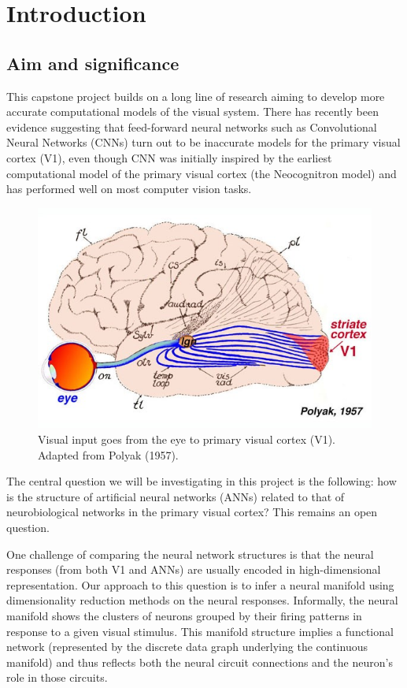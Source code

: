 \chapter{Introduction} 
\label{chapter-intro} 

\section{Aim and significance}
This capstone project builds on a long line of research aiming to develop more accurate computational models of the visual system. There has recently been evidence suggesting that feed-forward neural networks such as Convolutional Neural Networks (CNNs) turn out to be inaccurate models for the primary visual cortex (V1), even though CNN was initially inspired by the earliest computational model of the primary visual cortex (the Neocognitron model) and has performed well on most computer vision tasks. 
    \begin{figure}[H]
            \centering
                \includegraphics[width=0.25
             \textwidth]{presentation/figures-models/v1.jpg}
                \caption{Visual input goes from the eye to primary visual cortex (V1). Adapted from Polyak (1957).}
            \end{figure} 
            
The central question we will be investigating in this project is the following: how is the structure of artificial neural networks (ANNs) related to that of neurobiological networks in the primary visual cortex? This remains an open question.
    
\par One challenge of comparing the neural network structures is that the neural responses (from both V1 and ANNs) are usually encoded in high-dimensional representation.  Our approach to this question is to infer a neural manifold using dimensionality reduction methods on the neural responses. Informally, the neural manifold shows the clusters of neurons grouped by their firing patterns in response to a given visual stimulus.  This manifold structure implies a functional network (represented by the discrete data graph underlying the continuous manifold) and thus reflects both the neural circuit connections and the neuron’s role in those circuits. 

